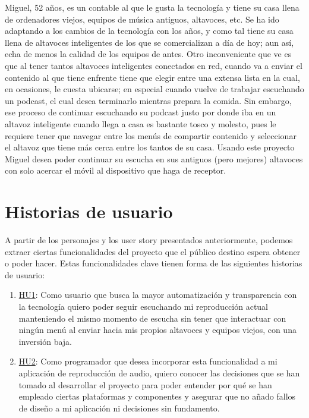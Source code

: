     Miguel, 52 años, es un contable al que le gusta la tecnología y tiene
    su casa llena de ordenadores viejos, equipos de música antiguos, altavoces,
    etc. Se ha ido adaptando a los cambios de la tecnología con los años, y como
    tal tiene su casa llena de altavoces inteligentes de los que se
    comercializan a día de hoy; aun así, echa de menos la calidad de los equipos
    de antes. Otro inconveniente que ve es que al tener tantos altavoces
    inteligentes conectados en red, cuando va a enviar el contenido al que tiene
    enfrente tiene que elegir entre una extensa lista en la cual, en ocasiones,
    le cuesta ubicarse; en especial cuando vuelve de trabajar escuchando un
    podcast, el cual desea terminarlo mientras prepara la comida. Sin embargo,
    ese proceso de continuar escuchando su podcast justo por donde iba en un
    altavoz inteligente cuando llega a casa es bastante tosco y molesto, pues le
    requiere tener que navegar entre los menús de compartir contenido y
    seleccionar el altavoz que tiene más cerca entre los tantos de su casa.
    Usando este proyecto Miguel desea poder continuar su escucha en sus antiguos
    (pero mejores) altavoces con solo acercar el móvil al dispositivo que haga
    de receptor.



\section{Historias de usuario}
A partir de los personajes y los user story presentados anteriormente, podemos
extraer ciertas funcionalidades del proyecto que el público destino espera
obtener o poder hacer. Estas funcionalidades clave tienen forma de las
siguientes historias de usuario:

\begin{enumerate}
    \item
    \href{https://github.com/migueorg/One-touch-music-streaming-TFG-ETSIIT/issues/10}{HU1}:
    Como usuario que busca la mayor automatización y transparencia con la
    tecnología quiero poder seguir escuchando mi reproducción actual manteniendo
    el mismo momento de escucha sin tener que interactuar con ningún menú al
    enviar hacia mis propios altavoces y equipos viejos, con una inversión baja.
    \item
    \href{https://github.com/migueorg/One-touch-music-streaming-TFG-ETSIIT/issues/14}{HU2}:
    Como programador que desea incorporar esta funcionalidad a mi aplicación de
    reproducción de audio, quiero conocer las decisiones que se han tomado al
    desarrollar el proyecto para poder entender por qué se han empleado ciertas
    plataformas y componentes y asegurar que no añado fallos de diseño a mi
    aplicación ni decisiones sin fundamento.
\end{enumerate}


